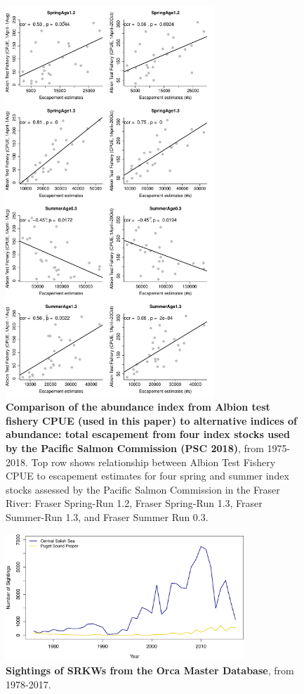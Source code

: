 \documentclass{article}
\begin{document}
\begin{figure}[ht]
\includegraphics[width=0.7\textwidth]{../analyses/orcaphen/figures/ctcalbion.pdf}
\caption{\textbf{Comparison of the abundance index from Albion test fishery CPUE (used in this paper) to alternative indices of abundance: total escapement from four index stocks used by the Pacific Salmon Commission (PSC 2018)}, from 1975-2018. Top row shows relationship between Albion Test Fishery CPUE to escapement estimates for four spring and summer index stocks assessed by the Pacific Salmon Commission in the Fraser River: Fraser Spring-Run 1.2, Fraser Spring-Run 1.3, Fraser Summer-Run 1.3, and Fraser Summer Run 0.3.}
\label{fig:ctcalb}
\end{figure}


\vspace*{\floatsep}

\begin{figure}[ht]
\includegraphics[width=0.8\textwidth]{../analyses/figures/OrcaPhenPlots/numsights_1976_2regs.png} 
\caption{\textbf{Sightings of SRKWs from the Orca Master Database}, from 1978-2017. }
\label{fig:sights}
\end{figure}
\end{document}
